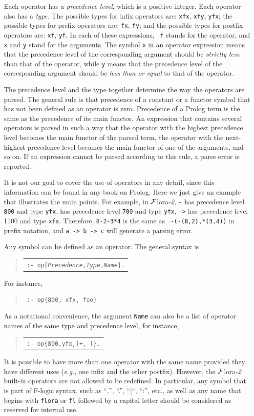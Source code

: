 \documentclass[11pt]{article}
\newcommand{\FLORA}{{\mbox{\sc ${\cal F}${lora}\rm\emph{-2}}}\xspace}
\newcommand{\FLSYSTEM}{\FLORA}
\newenvironment{qrules}{\begin{quote}\tt\begin{tabular}[t]{l}}%
{\end{tabular}\end{quote}}
\newcommand{\fl}{\mbox{F-logic}\xspace}
\begin{document}
%
Each operator has a \emph{precedence level}, which is a positive integer.
Each operator also has a \emph{type}. The possible types for infix operators
are: {\tt xfx}, {\tt xfy}, {\tt yfx}; the possible types for prefix
operators are: {\tt fx}, {\tt fy}; and the possible types for postfix
operators are: {\tt xf}, {\tt yf}. In each of these expressions, {\tt
  f} stands for the operator, and {\tt x} and {\tt y} stand for the
arguments.  The symbol {\tt x} in an operator expression means that the
precedence level of the corresponding argument should be \emph{strictly
  less} than that of the operator, while {\tt y} means that the precedence
level of the corresponding argument should be \emph{less than or equal} to
that of the operator.

The precedence level and the type together determine the way the operators
are parsed. The general rule is that precedence of a constant or a functor
symbol that has not been defined as an operator is zero. Precedence of a
Prolog term is the same as the precedence of its main functor. 
An expression that contains several operators is parsed in such a way that
the operator with the highest precedence level becomes the main functor of
the parsed term, the operator with the next-highest precedence
level becomes the main functor of one of the arguments, and so on.
If an expression cannot be parsed according to this rule, a parse error is
reported.

It is not our goal to cover the use of operators in any detail, since this
information can be found in any book on Prolog. Here we just give an
example that illustrates the main points.  For example, in \FLSYSTEM, {\tt -}
has precedence level {\tt 800} and type {\tt yfx}, {\tt *} has precedence
level {\tt 700} and type {\tt yfx}, {\tt ->} has precedence level 1100 and
type {\tt xfx}.  Therefore, {\tt 8-2-3*4} is the same as {\tt
  -(-(8,2),*(3,4))} in prefix notation, and {\tt a -> b -> c} will generate
a parsing error.


%
Any symbol can be defined as an operator. The general syntax is
\begin{qrules}
{\tt :- op\{\emph{Precedence},\emph{Type},\emph{Name}\}.}
\end{qrules}
For instance, 
\begin{quote}
 {\tt
   :- op\{800, xfx, foo\}
   }
\end{quote}
As a notational convenience, the argument {\tt Name} can also be a list of
operator names of the same type and precedence level, for instance,
\begin{qrules}
{\tt :- op\{800,yfx,[+,-]\}.}
\end{qrules}
It is possible to have more than one operator with the same name provided
they have different uses ({\it e.g.}, one infix and the other postfix).
However, the \FLSYSTEM built-in operators are not allowed to be redefined.
In particular, any symbol that is part of \fl syntax, such as ``,'', ``.'',
``[``, ``:'', etc., as well as any name that begins with {\tt flora} or
{\tt fl} followed by a capital letter should be considered as reserved for
internal use.
\end{document}
